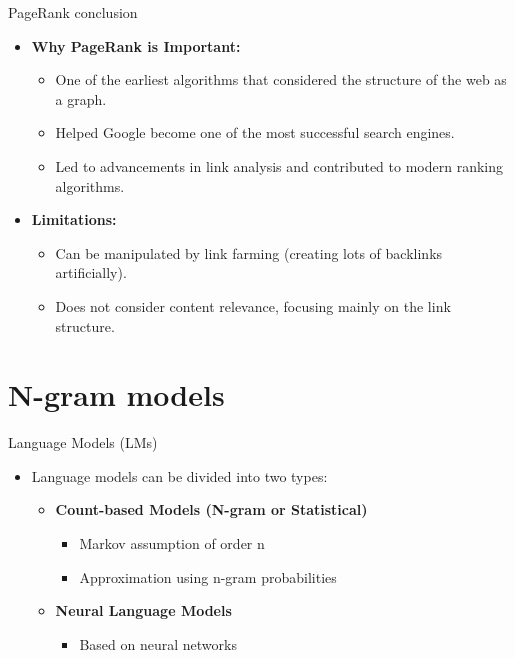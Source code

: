 \documentclass{beamer}
\begin{document}
\begin{frame}{PageRank conclusion}
    \begin{itemize}
        \item \textbf{Why PageRank is Important:}
        \begin{itemize}
            \item One of the earliest algorithms that considered the structure of the web as a graph.
            \item Helped Google become one of the most successful search engines.
            \item Led to advancements in link analysis and contributed to modern ranking algorithms.
        \end{itemize}
        \item \textbf{Limitations:}
        \begin{itemize}
            \item Can be manipulated by link farming (creating lots of backlinks artificially).
            \item Does not consider content relevance, focusing mainly on the link structure.
        \end{itemize}
    \end{itemize}
\end{frame}

\section{N-gram models}

\begin{frame}{Language Models (LMs)}
    \begin{itemize}
        \item Language models can be divided into two types:
        \begin{itemize}
            \item \textbf{Count-based Models (N-gram or Statistical)}
            \begin{itemize}
                \item Markov assumption of order n
                \item Approximation using n-gram probabilities
            \end{itemize}
            \item \textbf{Neural Language Models}
            \begin{itemize}
                \item Based on neural networks
            \end{itemize}
        \end{itemize}
    \end{itemize}
\end{frame}
\end{document}

